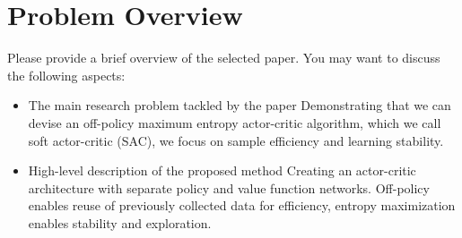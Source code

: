 \section{Problem Overview}
\label{section:intro}
Please provide a brief overview of the selected paper. You may want to discuss the following aspects:
\begin{itemize}
    \item The main research problem tackled by the paper
    Demonstrating that we can devise an off-policy maximum entropy actor-critic algorithm, which we
	call soft actor-critic (SAC), we focus on sample efficiency and learning stability.
    \item High-level description of the proposed method
    Creating an actor-critic architecture with separate policy and value function networks. Off-policy enables reuse of 				
    previously collected data for efficiency, entropy maximization enables stability and exploration.
\end{itemize}